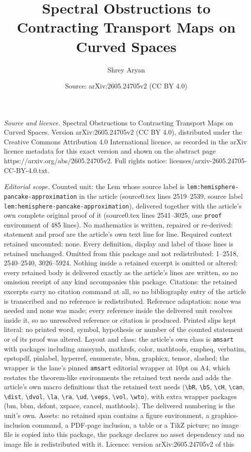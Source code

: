 \documentclass[10pt,a4paper]{amsart}
\title[Spectral Obstructions to Contracting Transport Maps on Curve]{Spectral Obstructions to Contracting Transport Maps on Curved Spaces}
\author{Shrey Aryan}
\date{Source: arXiv:2605.24705v2 (CC BY 4.0)}
\begin{document}
\maketitle

\noindent\emph{Source and licence.} Spectral Obstructions to Contracting Transport Maps on Curved Spaces. Version arXiv:2605.24705v2 (CC BY 4.0), distributed under the Creative Commons Attribution 4.0 International licence, as recorded in the arXiv licence metadata for this exact version and shown on the abstract page https://arxiv.org/abs/2605.24705v2. Full rights notice: licenses/arxiv-2605.24705-CC-BY-4.0.txt.\par\smallskip

\noindent\textit{Editorial scope.} Counted unit: the Lem whose source label is \texttt{lem:hemisphere-pancake-approximation} in the article (source0.tex lines 2519--2539, source label \texttt{lem:hemisphere-pancake-approximation}), delivered together with the article's own complete original proof of it (source0.tex lines 2541--3025, one \texttt{proof} environment of 485 lines). No mathematics is written, repaired or re-derived: statement and proof are the article's own text line for line. Required context retained uncounted: none. Every definition, display and label of those lines is retained unchanged. Omitted from this package and not redistributed: 1--2518, 2540--2540, 3026--5924. Nothing inside a retained excerpt is omitted or altered: every retained body is delivered exactly as the article's lines are written, so no omission receipt of any kind accompanies this package. Citations: the retained excerpts carry no citation command at all, so no bibliography entry of the article is transcribed and no reference is redistributed. Reference adaptation: none was needed and none was made; every reference inside the delivered unit resolves inside it, so no unresolved reference or citation is produced. Printed slips kept literal: no printed word, symbol, hypothesis or number of the counted statement or of its proof was altered. Layout and class: the article's own class is \texttt{amsart} with packages including amssymb, mathrsfs, color, mathtools, empheq, verbatim, epstopdf, pinlabel, hyperref, enumerate, bbm, graphicx, tensor, slashed; the wrapper is the lane's pinned \texttt{amsart} editorial wrapper at 10pt on A4, which restates the theorem-like environments the retained text needs and adds the article's own macro definitions that the retained text needs (\texttt{\textbackslash bR}, \texttt{\textbackslash bS}, \texttt{\textbackslash cH}, \texttt{\textbackslash can}, \texttt{\textbackslash dist}, \texttt{\textbackslash dvol}, \texttt{\textbackslash la}, \texttt{\textbackslash ra}, \texttt{\textbackslash ud}, \texttt{\textbackslash veps}, \texttt{\textbackslash vol}, \texttt{\textbackslash wto}), with extra wrapper packages (bm, bbm, dsfont, xspace, cancel, mathtools). The delivered numbering is the unit's own. Assets: no retained span contains a figure environment, a graphics-inclusion command, a PDF-page inclusion, a table or a TikZ picture; no image file is copied into this package, the package declares no asset dependency and no image file is redistributed with it. Licence: version arXiv:2605.24705v2 of this 
\end{document}
